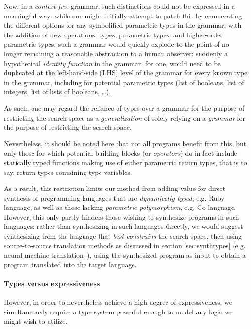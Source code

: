 \documentclass{article}
\begin{document}
Now, in a \emph{context-free} grammar,
such distinctions could not be expressed in a meaningful way:
while one might initially attempt to patch this by enumerating the different options for any symbolified parametric types in the grammar,
with the addition of new operations, types, parametric types, and higher-order parametric types,
such a grammar would quickly explode to the point of no longer remaining a reasonable abstraction to a human observer:
suddenly a hypothetical \emph{identity function} in the grammar, for one,
would need to be duplicated at the left-hand-side (LHS) level of the grammar for every known type in the grammar,
including for potential parametric types (list of booleans, list of integers, list of lists of booleans, \dots).

As such, one may regard the reliance of types over a grammar for the purpose of restricting the search space as a \emph{generalization} of solely relying on a \emph{grammar} for the purpose of restricting the search space.

Nevertheless, it should be noted here that not all programs benefit from this,
but only those for which potential building blocks (or \emph{operators}) do in fact include statically typed functions making use of either parametric return types, that is to say, return types containing type variables.

As a result, this restriction limits our method from adding value for direct synthesis of programming languages that are \emph{dynamically typed},
e.g. Ruby language, as well as those lacking \emph{parametric polymorphism}, e.g. Go language.
However, this only partly hinders those wishing to synthesize programs in such languages:
rather than synthesizing in such languages directly, we would suggest synthesizing from the language that \emph{best constrains} the search space,
then using source-to-source translation methods as discussed in section
\ref{sec:synthtypes}
(e.g. neural machine translation~\citep{kalchbrenner2013recurrent}),
using the synthesized program as input to obtain a program translated into the target language.

\paragraph{Types versus expressiveness}

However, in order to nevertheless achieve a high degree of expressiveness,
we simultaneously require a type system powerful enough to model any logic we might wish to utilize.
\end{document}
